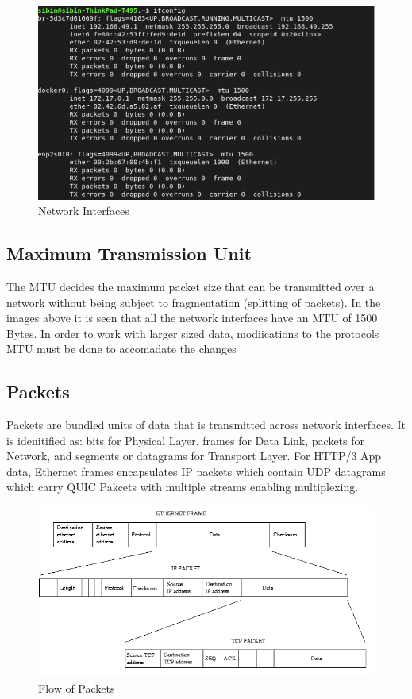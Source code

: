 \begin{figure}[h]
\caption{Network Interfaces}
\centering
\includegraphics[width=1\textwidth]{SOA/NIC.png}
\end{figure}

\subsection{Maximum Transmission Unit}

The MTU decides the maximum packet size that can be transmitted over a network without being subject to fragmentation (splitting of packets). In the images above it is seen that all the network interfaces have an MTU of 1500 Bytes. In order to work with larger sized data, modiications to the protocols MTU must be done to accomadate the changes




\subsection{Packets}

Packets are bundled units of data that is transmitted across network interfaces. It is idenitified as: bits  for Physical Layer, frames for Data Link, packets for Network, and segments or datagrams for Transport Layer. For HTTP/3 App data, Ethernet frames encapsulates IP packets which contain UDP datagrams which carry QUIC Pakcets with multiple streams enabling multiplexing.

\begin{figure}[H]
\caption{Flow of Packets}
\centering
\includegraphics[width=1\textwidth]{SOA/packets.png}
\end{figure}

